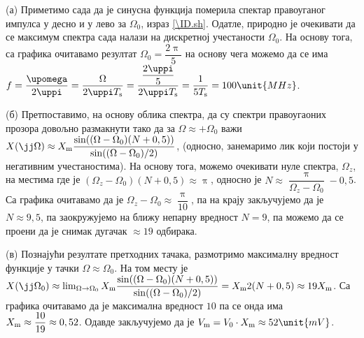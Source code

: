 (а) Приметимо сада да је синусна функција померила спектар правоуганог импулса у десно и у лево за 
$\Omega_0$, израз \eqref{\ID.sh}. Одатле, природно је очекивати да се максимум спектра сада налази на дискретној учестаности 
$\Omega_0$. На основу тога, са графика очитавамо резултат $\Omega_0 = \dfrac{2\uppi}{5}$ на основу чега можемо да 
се има $f = \dfrac{\upomega}{2\uppi} = \dfrac{\Omega}{2\uppi T_{\rm s}} = \dfrac{ \dfrac{2\uppi}{5} }{2 \uppi T_{\rm s}}
= \dfrac{1}{5 T_{\rm s}} = 100 \unit{MHz}$. 

(б) Претпоставимо, на основу облика спектра, да су спектри правоугаоних прозора довољно размакнути тако да 
за  $\Omega \approx +\Omega_0$ важи $X(\jj\Omega) \approx X_{\rm m} \dfrac{\sin( (\Omega - \Omega_0)(N + 0,5) ) }{ \sin((\Omega - \Omega_0)/2) }$, 
(односно, занемаримо лик који постоји у негативним учестаностима). На основу тога, можемо очекивати нуле спектра, 
$\Omega_z$,  
на местима где је $(\Omega_z - \Omega_0)(N + 0,5) \approx \uppi$, односно је 
$ N \approx \dfrac{\uppi}{\Omega_z - \Omega_0} - 0,5$. Са графика очитавамо да је 
${\Omega_z - \Omega_0} \approx \dfrac{\uppi}{10}$, па на крају закључујемо да је $N \approx 9,5$, па заокружујемо на 
ближу непарну вредност $N = 9$, па можемо да се проени да је снимак дугачак $\approx 19$ одбирака. 

(в) Познајући резултате претходних тачака, размотримо максималну вредност функције у тачки $\Omega \approx \Omega_0$. 
На том месту је 
$X(\jj\Omega_0) \approx \lim_{\Omega \to \Omega_0} X_{\rm m} \dfrac{\sin( (\Omega - \Omega_0)(N + 0,5) ) }{ \sin((\Omega - \Omega_0)/2) }
= X_{\rm m} 2(N + 0,5) \approx 19 X_{\rm m}$. Са графика очитавамо да је максимална вредност $10$ па се онда има 
$X_{\rm m} \approx \dfrac{10}{19} \approx 0,52$. Одавде закључујемо да је $V_{\rm m} = V_0 \cdot X_{\rm m} 
\approx 52\unit{mV}$.